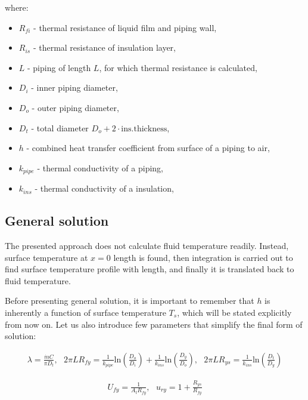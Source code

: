 \documentclass[10pt, letterpaper]{article}
\begin{document}
    \noindent where:
    \begin{itemize}
		\item $R_{fi}$ - thermal resistance of liquid film and piping wall,
		\item $R_{is}$ - thermal resistance of insulation layer,
		\item $L$ - piping of length $L$, for which thermal resistance is calculated,
		\item $D_{i}$ - inner piping diameter,
		\item $D_{o}$ - outer piping diameter,
		\item $D_{t}$ - total diameter $D_{o} + 2 \cdot \text{ins.thickness}$,
		\item $h$ - combined heat transfer coefficient from surface of a piping to air,
		\item $k_{pipe}$ - thermal conductivity of a piping,
		\item $k_{ins}$ - thermal conductivity of a insulation,
    \end{itemize}

	\subsection{General solution}

	The presented approach does not calculate fluid temperature readily. Instead, surface temperature at $x=0$ length is found, then integration is carried out to find surface temperature profile with length, and finally it is translated back to fluid temperature.

	Before presenting general solution, it is important to remember that $h$ is inherently a function of surface temperature $T_{s}$, which will be stated explicitly from now on. Let us also introduce few parameters that simplify the final form of solution:

	$$
	\begin{aligned}
		\lambda = \frac{\dot{m} C}{\pi D_{t}},\ \ \ 
		2 \pi L R_{fy} = \frac{1}{k_{pipe}} \text{ln} \left( \frac{D_{o}}{D_{i}} \right) +
		\frac{1}{k_{ins}} \text{ln} \left( \frac{D_{y}}{D_{o}} \right),\ \ \
		2 \pi L R_{ys} = \frac{1}{k_{ins}} \text{ln} \left( \frac{D_{t}}{D_{y}} \right)
		\label{eq:shorts1}
	\end{aligned}
	$$

	$$
	\begin{aligned}
		U_{fy} = \frac{1}{A_{t} R_{fy}},\ \ \
		u_{ry} = 1 + \frac{R_{ys}}{R_{fy}}
		\label{eq:shorts2}
	\end{aligned}
	$$
\end{document}
